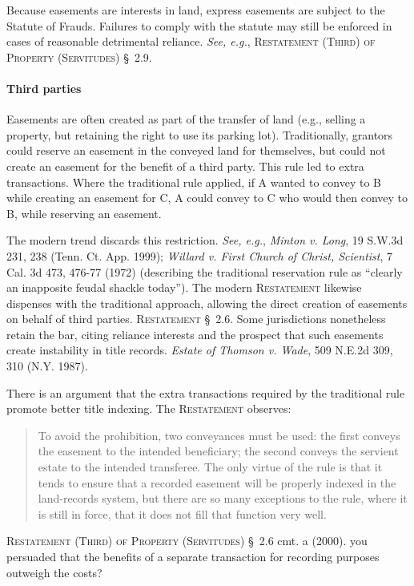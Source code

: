 Because easements are interests in land, express easements are subject to the
Statute of Frauds. Failures to comply with the statute may still be enforced in
cases of reasonable detrimental reliance. \textit{See, e.g.},
\textsc{Restatement (Third) of Property (Servitudes)} \S~2.9. 

\paragraph{Third parties}
Easements are often created as part of the transfer of land (e.g., selling a
property, but retaining the right to use its parking lot). Traditionally,
grantors could reserve an easement in the conveyed land for themselves, but
could not create an easement for the benefit of a third party. This rule led to
extra transactions. Where the traditional rule applied, if A wanted to convey to
B while creating an easement for C, A could convey to C who would then convey to
B, while reserving an easement. 

The modern trend discards this restriction. \textit{See, e.g.}, \emph{Minton v.
Long}, 19 S.W.3d 231, 238 (Tenn. Ct. App. 1999);
\emph{Willard v. First Church of Christ, Scientist}, 7 Cal. 3d 473, 476-77
(1972) (describing the traditional reservation rule as ``clearly an inapposite
feudal shackle today'').
The modern \textsc{Restatement} likewise dispenses
with the traditional approach, allowing the direct creation of easements on
behalf of third parties. \textsc{Restatement} \S~2.6. Some jurisdictions
nonetheless retain the bar, citing reliance interests and the prospect that such
easements create instability in title records. \emph{Estate of Thomson v. Wade},
509 N.E.2d 309, 310 (N.Y. 1987).

There is an argument that the extra
transactions required by the traditional rule promote better title indexing. The
\textsc{Restatement} observes:
\begin{quote}
To avoid the prohibition, two conveyances must be used: the first conveys the
easement to the intended beneficiary; the second conveys the servient estate to
the intended transferee. The only virtue of the rule is that it tends to ensure
that a recorded easement will be properly indexed in the land-records system,
but there are so many exceptions to the rule, where it is still in force, that
it does not fill that function very well.
\end{quote}
\textsc{Restatement (Third) of Property (Servitudes)} \S~2.6 cmt. a (2000).
you persuaded that the benefits of a separate transaction for recording purposes
outweigh the costs?

